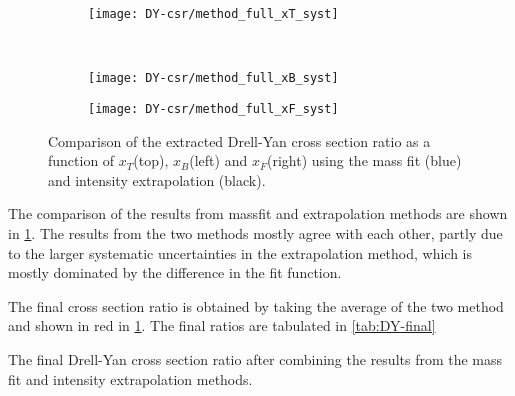 \documentclass[../main.tex]{subfiles}
\begin{document}
\begin{figure}[h!]
	\centering
	\begin{subfigure}{0.6\linewidth}
		\texttt{[image: DY-csr/method\_full\_xT\_syst]}
	\end{subfigure}\\
	\begin{subfigure}{0.45\linewidth}
		\texttt{[image: DY-csr/method\_full\_xB\_syst]}
	\end{subfigure}
	\begin{subfigure}{0.45\linewidth}
		\texttt{[image: DY-csr/method\_full\_xF\_syst]}
	\end{subfigure}
	\caption{Comparison of the extracted Drell-Yan cross section ratio as a function of $x_T$(top),
		$x_B$(left) and $x_F$(right) using the mass fit (blue)  and intensity extrapolation (black).}
	\label{fig:CSR_method}
\end{figure}
The comparison of the results from massfit and extrapolation methods are shown in \cref{fig:CSR_method}. 
The results from the two methods mostly agree with each other,
partly due to the larger systematic uncertainties in the extrapolation method,
which is mostly dominated by the difference in the fit function.

The final cross section ratio is obtained by taking the average of the two method and shown in red in \cref{fig:CSR_method}.
The final ratios are tabulated in \cref{tab:DY-final} 
\begin{table}[h!]
	\centering
	\caption{The final Drell-Yan cross section ratio after combining the results from the mass fit and intensity extrapolation methods.}
	\label{tab:DY-final}
	\scalebox{0.925}{
		
	}
\end{table}

\FloatBarrier

\ifSubfilesClassLoaded{ \printbibliography[heading=bibintoc,title={References}]}{}
\end{document}
